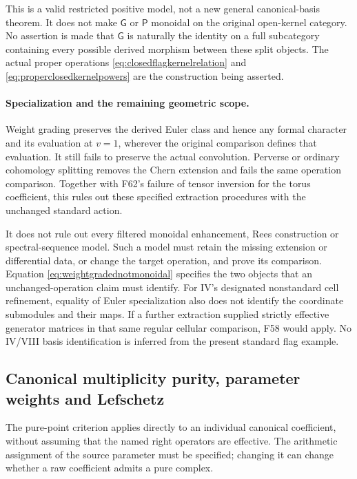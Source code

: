 \documentclass[11pt,a4paper]{article}
\newcommand{\fid}[1]{\textsf{#1}}\newcommand{\gate}[1]{\textsf{#1}}
\theoremstyle{named}\newtheorem{finding}{Finding}[section]
\theoremstyle{definition}\newtheorem{definition}[finding]{Definition}
\theoremstyle{remark}\newtheorem{remark}[finding]{Remark}
\begin{document}
This is a valid restricted positive model, not a new general
canonical-basis theorem. It does not make \(\mathsf G\) or
\(\mathsf P\) monoidal on the original open-kernel category.
No assertion is made that \(\mathsf G\) is naturally the
identity on a full subcategory containing every possible
derived morphism between these split objects. The actual
proper operations \eqref{eq:closedflagkernelrelation} and
\eqref{eq:properclosedkernelpowers} are the construction
being asserted.

\paragraph{Specialization and the remaining geometric scope.}
Weight grading preserves the derived Euler class and hence
any formal character and its evaluation at \(v=1\), wherever
the original comparison defines that evaluation. It still
fails to preserve the actual convolution. Perverse or ordinary
cohomology splitting removes the Chern extension and fails
the same operation comparison. Together with \fid{F62}'s
failure of tensor inversion for the torus coefficient, this
rules out these specified extraction procedures with the
unchanged standard action.

It does not rule out every filtered monoidal enhancement,
Rees construction or spectral-sequence model. Such a model
must retain the missing extension or differential data, or
change the target operation, and prove its comparison.
Equation \eqref{eq:weightgradednotmonoidal} specifies the
two objects that an unchanged-operation claim must identify.
For IV's designated nonstandard cell refinement, equality
of Euler specialization also does not identify the coordinate
submodules and their maps. If a further extraction supplied
strictly effective generator matrices in that same regular
cellular comparison, \fid{F58} would apply. No IV/VIII basis
identification is inferred from the present standard flag
example.

\subsection{Canonical multiplicity purity, parameter weights and Lefschetz}
\label{sec:canonicalPureComparison}

The pure-point criterion applies directly to an individual
canonical coefficient, without assuming that the named right
operators are effective. The arithmetic assignment of the
source parameter must be specified; changing it can change
whether a raw coefficient admits a pure complex.
\end{document}
